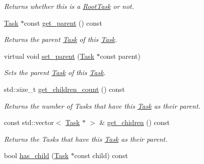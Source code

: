 \begin{DoxyCompactItemize}
\begin{DoxyCompactList}\small\item\em Returns whether this is a \hyperlink{classsigma_1_1core_1_1tasks_1_1_root_task}{Root\-Task} or not. \end{DoxyCompactList}\item 
\hyperlink{classsigma_1_1core_1_1tasks_1_1_task}{Task} $\ast$const \hyperlink{classsigma_1_1core_1_1tasks_1_1_task_a6949e9ea07ce3738f29c39b25acb9f26}{get\-\_\-parent} () const 
\begin{DoxyCompactList}\small\item\em Returns the parent \hyperlink{classsigma_1_1core_1_1tasks_1_1_task}{Task} of this \hyperlink{classsigma_1_1core_1_1tasks_1_1_task}{Task}. \end{DoxyCompactList}\item 
virtual void \hyperlink{classsigma_1_1core_1_1tasks_1_1_task_a975655055e70f4a2228153e84ff4e725}{set\-\_\-parent} (\hyperlink{classsigma_1_1core_1_1tasks_1_1_task}{Task} $\ast$const parent)
\begin{DoxyCompactList}\small\item\em Sets the parent \hyperlink{classsigma_1_1core_1_1tasks_1_1_task}{Task} of this \hyperlink{classsigma_1_1core_1_1tasks_1_1_task}{Task}. \end{DoxyCompactList}\item 
\hypertarget{classsigma_1_1core_1_1tasks_1_1_task_a75a3b0784751a8e82b56593407ba8858}{std\-::size\-\_\-t \hyperlink{classsigma_1_1core_1_1tasks_1_1_task_a75a3b0784751a8e82b56593407ba8858}{get\-\_\-children\-\_\-count} () const }\label{classsigma_1_1core_1_1tasks_1_1_task_a75a3b0784751a8e82b56593407ba8858}

\begin{DoxyCompactList}\small\item\em Returns the number of Tasks that have this \hyperlink{classsigma_1_1core_1_1tasks_1_1_task}{Task} as their parent. \end{DoxyCompactList}\item 
\hypertarget{classsigma_1_1core_1_1tasks_1_1_task_a3f6629626db9f1f283db8f7b897b99da}{const std\-::vector$<$ \hyperlink{classsigma_1_1core_1_1tasks_1_1_task}{Task} $\ast$ $>$ \& \hyperlink{classsigma_1_1core_1_1tasks_1_1_task_a3f6629626db9f1f283db8f7b897b99da}{get\-\_\-chidren} () const }\label{classsigma_1_1core_1_1tasks_1_1_task_a3f6629626db9f1f283db8f7b897b99da}

\begin{DoxyCompactList}\small\item\em Returns the Tasks that have this \hyperlink{classsigma_1_1core_1_1tasks_1_1_task}{Task} as their parent. \end{DoxyCompactList}\item 
\hypertarget{classsigma_1_1core_1_1tasks_1_1_task_a99e98800a473e1a05093d64853b75740}{bool \hyperlink{classsigma_1_1core_1_1tasks_1_1_task_a99e98800a473e1a05093d64853b75740}{has\-\_\-child} (\hyperlink{classsigma_1_1core_1_1tasks_1_1_task}{Task} $\ast$const child) const }\label{classsigma_1_1core_1_1tasks_1_1_task_a99e98800a473e1a05093d64853b75740}


\end{DoxyCompactItemize}
